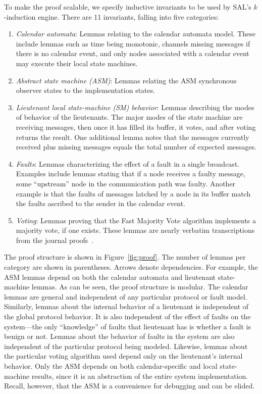 \documentclass{llncs/llncs}
\begin{document}
{To make the proof scalable, we specify inductive invariants to be used by SAL's $k$-induction engine. There are 11 invariants, falling into five categories:
\begin{enumerate}
  \item \emph{Calendar automata}: Lemmas relating to the calendar automata model. These include lemmas such as time being monotonic, channels missing messages if there is no calendar event, and only nodes associated with a calendar event may execute their local state machines.
  \item \emph{Abstract state machine (ASM)}: Lemmas relating the ASM synchronous observer states to the implementation states.
  \item \emph{Lieutenant local state-machine (SM) behavior}: Lemmas describing the modes of behavior of the lieutenants. The major modes of the state machine are receiving messages, then once it has filled its buffer, it votes, and after voting returns the result. One additional lemma notes that the messages currently received plus missing messages equals the total number of expected messages.
  \item \emph{Faults}: Lemmas characterizing the effect of a fault in a single broadcast. Examples include lemmas stating that if a node receives a faulty message, some ``upstream'' node in the communication path was faulty. Another example is that the faults of messages latched by a node in its buffer match the faults ascribed to the sender in the calendar event.
  \item \emph{Voting}: Lemmas proving that the Fast Majority Vote algorithm implements a majority vote, if one exists. These lemmas are nearly verbatim transcriptions from the journal proofs~\cite{mjrty}.
\end{enumerate}
\noindent
The proof structure is shown in Figure~\ref{fig:proof}. The number of lemmas per category are shown in parentheses. Arrows denote dependencies. For example, the ASM lemmas depend on both the calendar automata and lieutenant state-machine lemmas. As can be seen, the proof structure is modular. The calendar lemmas are general and independent of any particular protocol or fault model. Similarly, lemmas about the internal behavior of a lieutenant is independent of the global protocol behavior. It is also independent of the effect of faults on the system---the only ``knowledge'' of faults that lieutenant has is whether a fault is benign or not. Lemmas about the behavior of faults in the system are also independent of the particular protocol being modeled. Likewise, lemmas about the particular voting algorithm used depend only on the lieutenant's internal behavior. Only the ASM depends on both calendar-specific and local state-machine results, since it is an abstraction of the entire system implementation. Recall, however, that the ASM is a convenience for debugging and can be elided.

}
\end{document}
